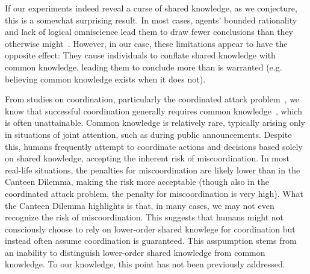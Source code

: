 \documentclass[twocolumn,a4paper,superscriptaddress,nofootinbib]{revtex4}
\newcommand{\re}[1]{{\color{brown} RE: #1}}
\begin{document}


If our experiments indeed %
reveal a curse of shared knowledge, as we conjecture, this is a somewhat surprising result. In most cases, agents' bounded rationality and lack of logical omniscience lead them to %
draw fewer conclusions 
than they %
otherwise %
might~\citep{fagin1995reasoning, halpern2011dealing}.
However, in our case, %
these limitations appear to have the opposite effect: They cause individuals to
conflate shared knowledge with common knowledge, %
leading them 
to conclude more than is warranted (e.g. believing %
common knowledge exists when %
it does not). 

From studies on coordination, particularly the coordinated attack problem~\citep{fagin1995reasoning}, we know that successful coordination generally requires common knowledge~\citep{moses2016relating}, %
which is often unattainable.
Common knowledge is relatively rare, %
typically arising only %
in situations of joint %
attention, such as during public announcements. %
Despite this, humans frequently attempt to coordinate actions and %
decisions based solely on
shared knowledge, %
accepting the inherent risk of miscoordination. In most real-life situations, the penalties for miscoordination %
are likely lower than in the Canteen Dilemma, %
making the risk more acceptable (though also in the coordinated attack problem, the penalty for miscoordination is very high). %
What the Canteen Dilemma highlights is that, in many cases, we may not even recognize the risk of miscoordination.
This suggests that humans might not consciously choose to 
rely on lower-order shared knowlege for coordination but %
instead often
assume coordination %
is
guaranteed. %
This asspumption stems from an inability
to distinguish lower-order shared knowledge from common knowledge. 
To our knowledge, this point has not been %
previously addressed.
\end{document}
